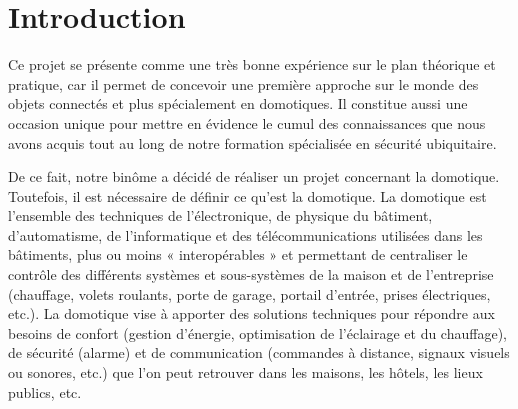 
\tableofcontents
\clearpage

%
% 
%
%
%
%



\newpage
\chapter{Introduction}

Ce projet se présente comme une très bonne expérience sur le plan théorique et pratique, car il permet de concevoir une première approche sur le monde des objets connectés et plus spécialement en domotiques. Il constitue aussi une occasion unique pour mettre en évidence le cumul des connaissances que nous avons acquis tout au long de notre formation spécialisée en sécurité ubiquitaire.


De ce fait, notre binôme a décidé de réaliser un projet concernant la domotique. Toutefois, il est nécessaire de définir ce qu'est la domotique. La domotique est l'ensemble des techniques de l'électronique, de physique du bâtiment, d'automatisme, de l'informatique et des télécommunications utilisées dans les bâtiments, plus ou moins « interopérables » et permettant de centraliser le contrôle des différents systèmes et sous-systèmes de la maison et de l'entreprise (chauffage, volets roulants, porte de garage, 
portail d'entrée, prises électriques, etc.). La domotique vise à apporter des solutions techniques pour répondre aux besoins de 
confort (gestion d'énergie, optimisation de l'éclairage et du chauffage), de sécurité (alarme) et de communication (commandes à 
distance, signaux visuels ou sonores, etc.) que l'on peut retrouver dans les maisons, les hôtels, les lieux publics, etc.


